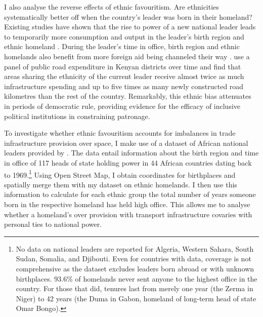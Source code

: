 \documentclass[11pt, oneside]{article}   	%
\begin{document}
I also analyse the reverse effects of ethnic favouritism. Are ethnicities systematically better off when the country's leader was born in their homeland? Existing studies have shown that the rise to power of a new national leader leads to temporarily more consumption and output in the leader's birth region \citep{Hodler_RegionalFavoritism_2014} and ethnic homeland \citep{DeLuca_Ethnicfavoritismaxiom_2018}. During the leader's time in office, birth region and ethnic homelands also benefit from more foreign aid being channeled their way \citep{Dreher_AiddemandAfrican_2016}. \cite{burgess_value_2015} use a panel of public road expenditure in Kenyan districts over time and find that areas sharing the ethnicity of the current leader receive almost twice as much infrastructure spending and up to five times as many newly constructed road kilometres than the rest of the country. Remarkably, this ethnic bias attenuates in periods of democratic rule, providing evidence for the efficacy of inclusive political institutions in constraining patronage.

To investigate whether ethnic favouritism accounts for imbalances in trade infrastructure provision over space, I make use of a dataset of African national leaders provided by \cite{Dreher_AiddemandAfrican_2016}. The data entail information about the birth region and time in office of 117 heads of state holding power in 44 African countries dating back to 1969.\footnote{No data on national leaders are reported for Algeria, Western Sahara, South Sudan, Somalia, and Djibouti. Even for countries with data, coverage is not comprehensive as the dataset excludes leaders born abroad or with unknown birthplaces. 93.6\% of homelands never sent anyone to the highest office in the country. For those that did, tenures last from merely one year (the Zerma in Niger) to 42 years (the Duma in Gabon, homeland of long-term head of state Omar Bongo).} Using Open Street Map, I obtain coordinates for birthplaces and spatially merge them with my dataset on ethnic homelands. I then use this information to calculate for each ethnic group the total number of years someone born in the respective homeland has held high office. This allows me to analyse whether a homeland's over provision with transport infrastructure covaries with personal ties to national power.
\end{document}
